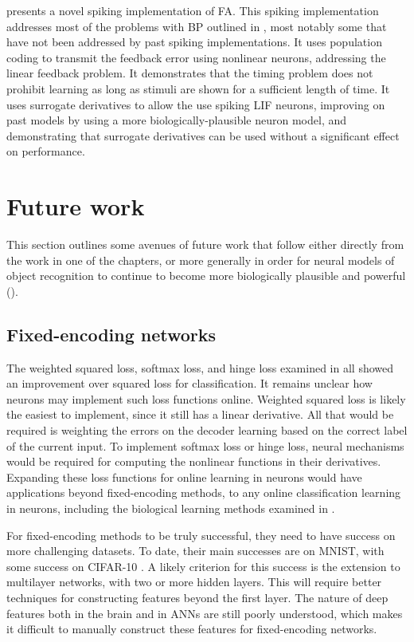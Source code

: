  presents a novel spiking implementation of FA.
This spiking implementation addresses most of the problems
with BP outlined in ,
most notably some that have not been addressed by
past spiking implementations.
It uses population coding to transmit the feedback error
using nonlinear neurons, addressing the linear feedback problem.
It demonstrates that the timing problem does not prohibit learning
as long as stimuli are shown for a sufficient length of time.
It uses surrogate derivatives to allow the use spiking LIF neurons,
improving on past models by using a more biologically-plausible neuron model,
and demonstrating that surrogate derivatives can be used
without a significant effect on performance.


\section{Future work}

This section outlines some avenues of future work
that follow either directly from the work in one of the chapters,
or more generally in order for neural models of object recognition
to continue to become more biologically plausible and powerful ().


\subsection{Fixed-encoding networks}

The weighted squared loss, softmax loss, and hinge loss examined in 
all showed an improvement over squared loss for classification.
It remains unclear how neurons may implement such loss functions online.
Weighted squared loss is likely the easiest to implement,
since it still has a linear derivative.
All that would be required is weighting the errors on the decoder learning
based on the correct label of the current input.
To implement softmax loss or hinge loss,
neural mechanisms would be required
for computing the nonlinear functions in their derivatives.
Expanding these loss functions for online learning in neurons
would have applications beyond fixed-encoding methods,
to any online classification learning in neurons,
including the biological learning methods examined in .

For fixed-encoding methods to be truly successful,
they need to have success on more challenging datasets.
To date, their main successes are on MNIST,
with some success on CIFAR-10 \parencite{McDonnell2015a}.
A likely criterion for this success is the extension to multilayer networks,
with two or more hidden layers.
This will require better techniques for constructing features
beyond the first layer.
The nature of deep features both in the brain and in ANNs
are still poorly understood,
which makes it difficult to manually construct these features
for fixed-encoding networks.



